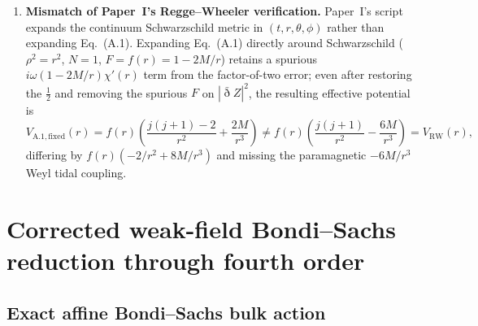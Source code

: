 \documentclass[11pt]{article}
\newcommand{\bareth}{\bar{\eth}}
\begin{document}
\begin{enumerate}
\item \textbf{Mismatch of Paper~I's Regge--Wheeler verification.} Paper~I's script  expands the continuum Schwarzschild metric in $(t,r,\theta,\phi)$ rather than expanding Eq.~(A.1). Expanding Eq.~(A.1) directly around Schwarzschild ($\rho^2=r^2$, $N=1$, $F=f(r)=1-2M/r$) retains a spurious $i\omega(1-2M/r)\chi'(r)$ term from the factor-of-two error; even after restoring the $\frac{1}{2}$ and removing the spurious $F$ on $|\bareth Z|^2$, the resulting effective potential is
\begin{equation}\label{eq:rw_mismatch}
V_{\mathrm{A.1,fixed}}(r) = f(r)\!\left(\frac{j(j+1)-2}{r^2} + \frac{2M}{r^3}\right) \neq f(r)\!\left(\frac{j(j+1)}{r^2} - \frac{6M}{r^3}\right) = V_{\mathrm{RW}}(r),
\end{equation}
differing by $f(r)(-2/r^2 + 8M/r^3)$ and missing the paramagnetic $-6M/r^3$ Weyl tidal coupling.
\end{enumerate}

\section{Corrected weak-field Bondi--Sachs reduction through fourth order}\label{sec:weakfield}

\subsection{Exact affine Bondi--Sachs bulk action}
\end{document}
